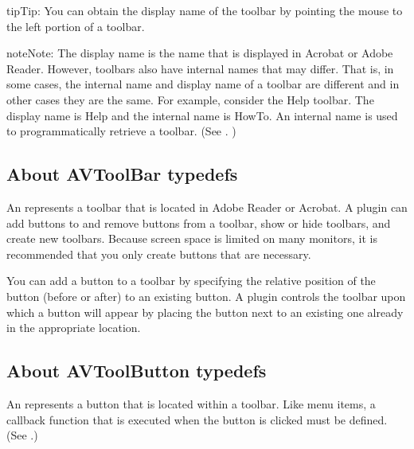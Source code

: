 \documentclass[letterpaper,12pt,english,openany,oneside]{sphinxmanual}
\begin{document}
\noindent{}

\begin{sphinxadmonition}{tip}{Tip:}
You can obtain the display name of the toolbar by pointing the mouse to the left portion of a toolbar.
\end{sphinxadmonition}

\begin{sphinxadmonition}{note}{Note:}
The display name is the name that is displayed in Acrobat or Adobe Reader. However, toolbars also have internal names that may differ. That is, in some cases, the internal name and display name of a toolbar are different and in other cases they are the same. For example, consider the Help toolbar. The display name is Help and the internal name is HowTo. An internal name is used to programmatically retrieve a toolbar. (See . )
\end{sphinxadmonition}


\subsection{About AVToolBar typedefs}
\label{\detokenize{Plugins_Toolbutton:about-avtoolbar-typedefs}}
An  represents a toolbar that is located in Adobe Reader or Acrobat. A plugin can add buttons to and remove buttons from a toolbar, show or hide toolbars, and create new toolbars. Because screen space is limited on many monitors, it is recommended that you only create buttons that are necessary.

You can add a button to a toolbar by specifying the relative position of the button (before or after) to an existing button. A plugin controls the toolbar upon which a button will appear by placing the button next to an existing one already in the appropriate location.


\subsection{About AVToolButton typedefs}
\label{\detokenize{Plugins_Toolbutton:about-avtoolbutton-typedefs}}
An  represents a button that is located within a toolbar. Like menu items, a callback function that is executed when the button is clicked must be defined. (See .)
\end{document}
